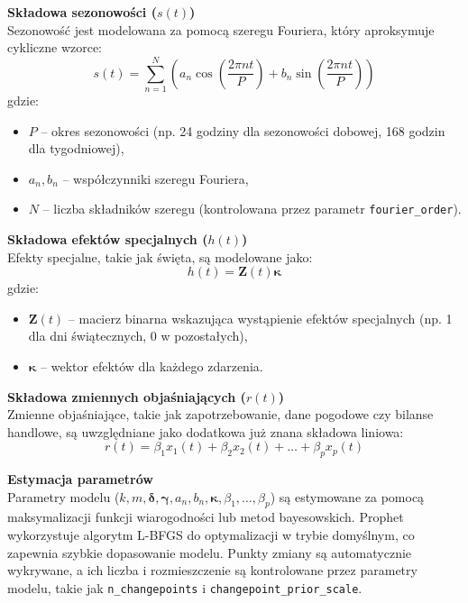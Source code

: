 \textbf{Składowa sezonowości (\( s(t) \))} \\
Sezonowość jest modelowana za pomocą szeregu Fouriera, który aproksymuje cykliczne wzorce:
\begin{equation}
s(t) = \sum_{n=1}^N \left( a_n \cos\left(\frac{2\pi n t}{P}\right) + b_n \sin\left(\frac{2\pi n t}{P}\right) \right)
\end{equation}
gdzie:
\begin{itemize}
    \item \( P \) -- okres sezonowości (np. 24 godziny dla sezonowości dobowej, 168 godzin dla tygodniowej),
    \item \( a_n, b_n \) -- współczynniki szeregu Fouriera,
    \item \( N \) -- liczba składników szeregu (kontrolowana przez parametr \texttt{fourier\_order}).
\end{itemize}

\textbf{Składowa efektów specjalnych (\( h(t) \))} \\
Efekty specjalne, takie jak święta, są modelowane jako:
\begin{equation}
h(t) = \mathbf{Z}(t) \boldsymbol{\kappa}
\end{equation}
gdzie:
\begin{itemize}
    \item \( \mathbf{Z}(t) \) -- macierz binarna wskazująca wystąpienie efektów specjalnych (np. 1 dla dni świątecznych, 0 w pozostałych),
    \item \( \boldsymbol{\kappa} \) -- wektor efektów dla każdego zdarzenia.
\end{itemize}

\textbf{Składowa zmiennych objaśniających (\( r(t) \))} \\
Zmienne objaśniające, takie jak zapotrzebowanie, dane pogodowe czy bilanse handlowe, są uwzględniane jako dodatkowa już znana składowa liniowa:
\begin{equation}
r(t) = \beta_1 x_1(t) + \beta_2 x_2(t) + \dots + \beta_p x_p(t)
\end{equation}

\textbf{Estymacja parametrów} \\
Parametry modelu (\( k, m, \boldsymbol{\delta}, \boldsymbol{\gamma}, a_n, b_n, \boldsymbol{\kappa}, \beta_1, \dots, \beta_p \)) są estymowane za pomocą maksymalizacji funkcji wiarogodności lub metod bayesowskich. Prophet wykorzystuje algorytm L-BFGS do optymalizacji w trybie domyślnym, co zapewnia szybkie dopasowanie modelu. Punkty zmiany są automatycznie wykrywane, a ich liczba i rozmieszczenie są kontrolowane przez parametry modelu, takie jak \texttt{n\_changepoints} i \texttt{changepoint\_prior\_scale}.

